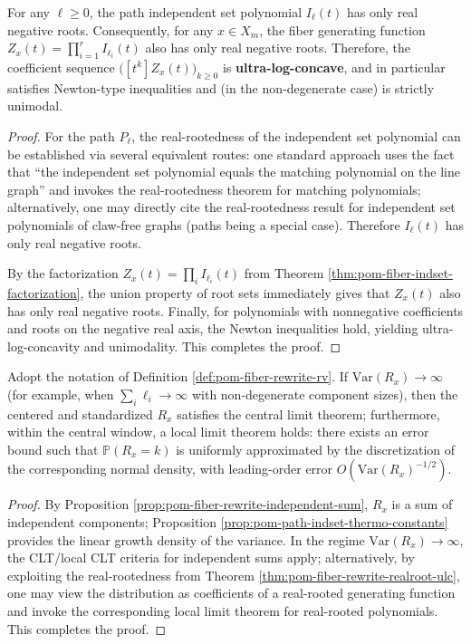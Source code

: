 \begin{theorem}\label{thm:pom-fiber-rewrite-realroot-ulc}
For any \(\ell\ge 0\), the path independent set polynomial \(I_{\ell}(t)\) has only real negative roots.
Consequently, for any \(x\in X_m\), the fiber generating function
\(
Z_x(t)=\prod_{i=1}^r I_{\ell_i}(t)
\)
also has only real negative roots.
Therefore, the coefficient sequence \(\bigl([t^k]Z_x(t)\bigr)_{k\ge 0}\) is \textbf{ultra-log-concave},
and in particular satisfies Newton-type inequalities and (in the non-degenerate case) is strictly unimodal.
\end{theorem}
\begin{proof}
For the path \(P_{\ell}\), the real-rootedness of the independent set polynomial can be established via several equivalent routes:
one standard approach uses the fact that ``the independent set polynomial equals the matching polynomial on the line graph'' and invokes the real-rootedness theorem for matching polynomials;
alternatively, one may directly cite the real-rootedness result for independent set polynomials of claw-free graphs (paths being a special case).
Therefore \(I_{\ell}(t)\) has only real negative roots.
\par
By the factorization \(Z_x(t)=\prod_i I_{\ell_i}(t)\) from Theorem \ref{thm:pom-fiber-indset-factorization},
the union property of root sets immediately gives that \(Z_x(t)\) also has only real negative roots.
Finally, for polynomials with nonnegative coefficients and roots on the negative real axis, the Newton inequalities hold, yielding ultra-log-concavity and unimodality. This completes the proof.
\end{proof}

\begin{corollary}\label{cor:pom-fiber-rewrite-local-clt}
Adopt the notation of Definition \ref{def:pom-fiber-rewrite-rv}.
If \(\mathrm{Var}(R_x)\to\infty\) (for example, when \(\sum_i \ell_i\to\infty\) with non-degenerate component sizes),
then the centered and standardized \(R_x\) satisfies the central limit theorem; furthermore, within the central window, a local limit theorem holds:
there exists an error bound such that \(\mathbb P(R_x=k)\) is uniformly approximated by the discretization of the corresponding normal density,
with leading-order error \(O(\mathrm{Var}(R_x)^{-1/2})\).
\end{corollary}
\begin{proof}
By Proposition \ref{prop:pom-fiber-rewrite-independent-sum}, \(R_x\) is a sum of independent components;
Proposition \ref{prop:pom-path-indset-thermo-constants} provides the linear growth density of the variance.
In the regime \(\mathrm{Var}(R_x)\to\infty\),
the CLT/local CLT criteria for independent sums apply;
alternatively, by exploiting the real-rootedness from Theorem \ref{thm:pom-fiber-rewrite-realroot-ulc},
one may view the distribution as coefficients of a real-rooted generating function and invoke the corresponding local limit theorem for real-rooted polynomials.
This completes the proof.
\end{proof}

